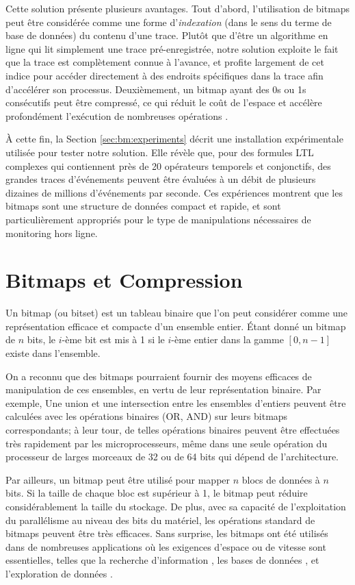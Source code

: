 Cette solution présente plusieurs avantages. Tout d'abord, l'utilisation de bitmaps peut être considérée comme une forme d'\emph{indexation} (dans le sens du terme de base de données) du contenu d'une trace. Plutôt que d'être un algorithme en ligne qui lit simplement une trace pré-enregistrée, notre solution exploite le fait que la trace est complètement connue à l'avance, et profite largement de cet indice pour accéder directement à des endroits spécifiques dans la trace afin d'accélérer son processus. Deuxièmement, un bitmap ayant des 0s ou 1s consécutifs peut être compressé, ce qui réduit le coût de l'espace et accélère profondément l'exécution de nombreuses opérations \citep{lemire2014}.

À cette fin, la Section \ref{sec:bm:experiments} décrit une installation expérimentale utilisée pour tester notre solution. Elle révèle que, pour des formules LTL complexes qui contiennent près de 20 opérateurs temporels et conjonctifs, des grandes traces d'événements peuvent être évaluées à un débit de plusieurs dizaines de millions d'événements par seconde. Ces expériences montrent que les bitmaps sont une structure de données compact et rapide, et sont particulièrement appropriés pour le type de manipulations nécessaires de monitoring hors ligne.

\section{Bitmaps et Compression}\label{sec:bm:compression} %

Un bitmap (ou bitset) est un tableau binaire que l'on peut considérer comme une représentation efficace et compacte d'un ensemble entier. Étant donné un bitmap de $n$ bits, le $i$-ème bit est mis à 1 si le $i$-ème entier dans la gamme $[0, n-1]$ existe dans l'ensemble.

On a reconnu que des bitmaps pourraient fournir des moyens efficaces de manipulation de ces ensembles, en vertu de leur représentation binaire. Par exemple, Une union et une intersection entre les ensembles d'entiers peuvent être calculées avec les opérations binaires (OR, AND) sur leurs bitmaps correspondants; à leur tour, de telles opérations binaires peuvent être effectuées très rapidement par les microprocesseurs, même dans une seule opération du processeur de larges morceaux de 32 ou de 64 bits qui dépend de l'architecture.

Par ailleurs, un bitmap peut être utilisé pour mapper $n$ blocs de données à $n$ bits. Si la taille de chaque bloc est supérieur à 1, le bitmap peut réduire considérablement la taille du stockage. De plus, avec sa capacité de l'exploitation du parallélisme au niveau des bits du matériel, les opérations standard de bitmaps peuvent être très efficaces. Sans surprise, les bitmaps ont été utilisés dans de nombreuses applications où les exigences d'espace ou de vitesse sont essentielles, telles que la recherche d'information \citep{Chan:1998:BID:276305.276336}, les bases de données \citep{burdick2001mafia}, et l'exploration de données \citep{Ayres:2002:SPM:775047.775109,Uno:2005:LVC:1133905.1133916}.

